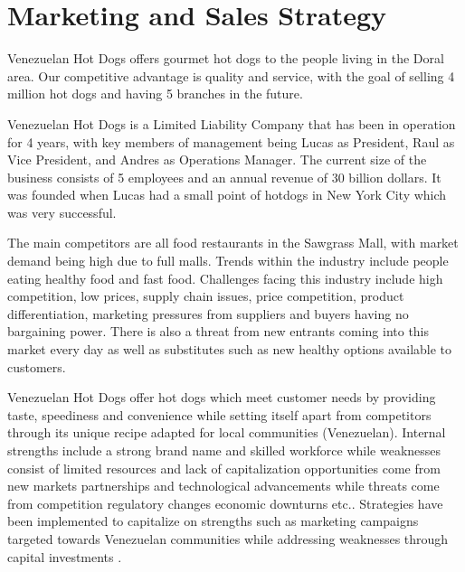

\section{Marketing and Sales Strategy}\label{sec:marketing-sales-strategy}

 Venezuelan Hot Dogs offers gourmet hot dogs to the people living in the Doral area. Our competitive advantage is quality and service, with the goal of selling 4 million hot dogs and having 5 branches in the future. 

 Venezuelan Hot Dogs is a Limited Liability Company that has been in operation for 4 years, with key members of management being Lucas as President, Raul as Vice President, and Andres as Operations Manager. The current size of the business consists of 5 employees and an annual revenue of 30 billion dollars. It was founded when Lucas had a small point of hotdogs in New York City which was very successful. 

 The main competitors are all food restaurants in the Sawgrass Mall, with market demand being high due to full malls. Trends within the industry include people eating healthy food and fast food. Challenges facing this industry include high competition, low prices, supply chain issues, price competition, product differentiation, marketing pressures from suppliers and buyers having no bargaining power. There is also a threat from new entrants coming into this market every day as well as substitutes such as new healthy options available to customers. 

 Venezuelan Hot Dogs offer hot dogs which meet customer needs by providing taste, speediness and convenience while setting itself apart from competitors through its unique recipe adapted for local communities (Venezuelan). Internal strengths include a strong brand name and skilled workforce while weaknesses consist of limited resources and lack of capitalization opportunities come from new markets partnerships and technological advancements while threats come from competition regulatory changes economic downturns etc.. Strategies have been implemented to capitalize on strengths such as marketing campaigns targeted towards Venezuelan communities while addressing weaknesses through capital investments  .  

